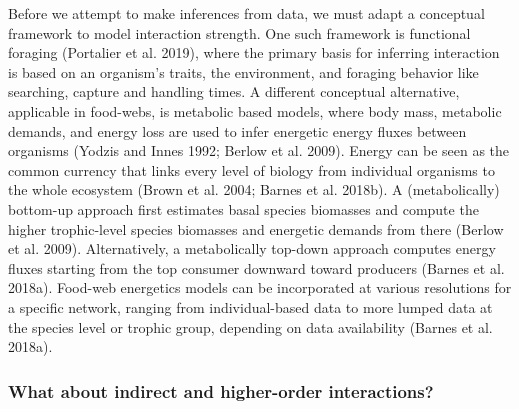 \documentclass[10pt,oneside]{article}
\begin{document}
Before we attempt to make inferences from data, we must adapt a
conceptual framework to model interaction strength. One such framework
is functional foraging (Portalier et al. 2019), where the primary basis
for inferring interaction is based on an organism's traits, the
environment, and foraging behavior like searching, capture and handling
times. A different conceptual alternative, applicable in food-webs, is
metabolic based models, where body mass, metabolic demands, and energy
loss are used to infer energetic energy fluxes between organisms (Yodzis
and Innes 1992; Berlow et al. 2009). Energy can be seen as the common
currency that links every level of biology from individual organisms to
the whole ecosystem (Brown et al. 2004; Barnes et al. 2018b). A
(metabolically) bottom-up approach first estimates basal species
biomasses and compute the higher trophic-level species biomasses and
energetic demands from there (Berlow et al. 2009). Alternatively, a
metabolically top-down approach computes energy fluxes starting from the
top consumer downward toward producers (Barnes et al. 2018a). Food-web
energetics models can be incorporated at various resolutions for a
specific network, ranging from individual-based data to more lumped data
at the species level or trophic group, depending on data availability
(Barnes et al. 2018a).

\hypertarget{what-about-indirect-and-higher-order-interactions}{%
\subsubsection{What about indirect and higher-order
interactions?}\label{what-about-indirect-and-higher-order-interactions}}
\end{document}

